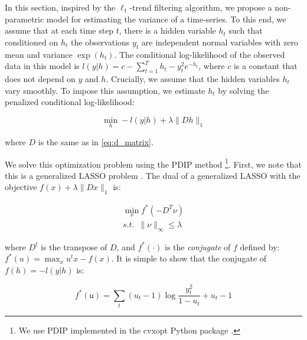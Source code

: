 \documentclass{article}
\begin{document}


In this section, inspired by the $\ell_1$-trend filtering algorithm, we propose a non-parametric model for estimating the variance of a time-series. To this end, we assume that at each time step $t$, there is a hidden variable $h_t$ such that conditioned on $h_t$ the observations $y_t$ are independent normal variables with zero mean and variance $\exp(h_t)$. The conditional log-likelihood of the observed data in this model is $l(y|h)=c-\sum_{t=1}^Th_t-y_t^2e^{-h_t}$, where $c$ is a constant that does not depend on $y$ and $h$. Crucially, we assume that the hidden variables $h_t$ vary smoothly. To impose this assumption, we estimate $h_t$ by solving the penalized conditional log-likelihood:

\begin{equation}
\min_h -l(y|h)+\lambda \lVert Dh \lVert_1
\label{eq:l1tf_var}
\end{equation}

 where $D$ is the same as in \eqref{eq:d_matrix}.


We solve this optimization problem using the PDIP method \footnote{We use PDIP implemented in the cvxopt Python package \citep{andersen_cvxopt:_2013}.}. First, we note that this is a generalized LASSO problem \citep{tibshirani_solution_2011}. The dual of a generalized LASSO with the objective $f(x)+\lambda \lVert Dx \lVert_1$ is:

\begin{equation}
\begin{aligned}
\min_\nu f^*(-D^T\mathsf{\nu}) \\
s.t. \,\,\, \lVert \mathsf{\nu} \lVert_\infty \le \lambda
\end{aligned}
\end{equation}

 where $D^t$ is the transpose of $D$, and $f^*(\cdot)$ is the \textit{conjugate} of $f$ defined by: $f^*(u)=\max_x u^tx-f(x)$. It is simple to show that the conjugate of $f(h)=-l(y|h)$ is:

\begin{equation}
f^*(\mathsf{u})=\sum_t (u_t-1)\log\frac{y_t^2}{1-u_t} + u_t-1
\label{eq:conj}
\end{equation}
\end{document}
